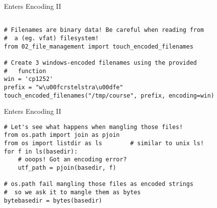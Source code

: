 \documentclass{beamer}[10]
\begin{document}
\begin{frame}[fragile]{Enters Encoding II}
\begin{verbatim}

# Filenames are binary data! Be careful when reading from
#  a (eg. vfat) filesystem!
from 02_file_management import touch_encoded_filenames

# Create 3 windows-encoded filenames using the provided 
#   function
win = 'cp1252'
prefix = "w\u00fcrstelstra\u00dfe"
touch_encoded_filenames("/tmp/course", prefix, encoding=win)

\end{verbatim}
\end{frame}



\begin{frame}[fragile]{Enters Encoding II}
\begin{verbatim}
# Let's see what happens when mangling those files!
from os.path import join as pjoin
from os import listdir as ls		# similar to unix ls!
for f in ls(basedir):
    # ooops! Got an encoding error?
    utf_path = pjoin(basedir, f)

# os.path fail mangling those files as encoded strings
#  so we ask it to mangle them as bytes
bytebasedir = bytes(basedir)

\end{verbatim}
\end{frame}
\end{document}
